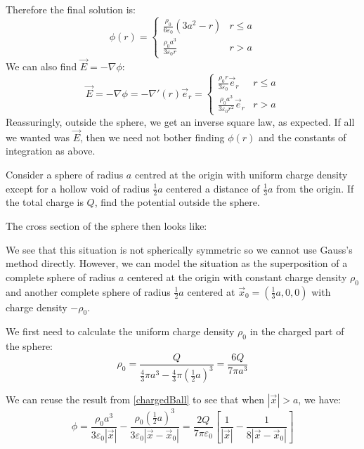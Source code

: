\documentclass[../main.tex]{subfiles}
\begin{document}
\begin{example}
  Therefore the final solution is:
  \[
    \phi(r) = \begin{cases}
    \frac{\rho_0}{6 \varepsilon_0}(3a^2 - r) &  r \leq a\\
    \frac{\rho_0 a^3}{3\varepsilon_0 r} &  r > a
    \end{cases}
  \]
  We can also find $\vec{E} = - \nabla \phi$:
  \[
    \vec{E} = -\nabla \phi = -\nabla'(r)\vec{e}_r = \begin{cases}
    \frac{\rho_0 r}{3\varepsilon_0} \vec{e}_r & r\leq a \\
    \frac{\rho_0 a^3}{3 \varepsilon_0 r^2}\vec{e}_r &  r> a
    \end{cases}
  \]
  Reassuringly, outside the sphere, we get an inverse square law, as expected.
  If all we wanted was $\vec{E}$, then we need not bother finding $\phi(r)$ and the constants of integration as above.
\end{example}
\begin{example}
  Consider a sphere of radius $a$ centred at the origin with uniform charge density except for a hollow void of radius $\frac{1}{2}a$ centered a distance of $\frac{1}{3}a$ from the origin. \label{asymmetricSpheres}
  If the total charge is $Q$, find the potential outside the sphere.

  The cross section of the sphere then looks like:
  \begin{center}
  \end{center}
  We see that this situation is not spherically symmetric so we cannot use Gauss's method directly.
  However, we can model the situation as the superposition of a complete sphere of radius $a$ centered at the origin with constant charge density $\rho_0$ and another complete sphere of radius $\frac{1}{2}a$ centered at $\vec{x}_0 = (\frac{1}{3}a, 0, 0)$ with charge density $-\rho_0$.

  We first need to calculate the uniform charge density $\rho_0$ in the charged part of the sphere:
  \[
    \rho_0 = \frac{Q}{\frac{4}{3}\pi a^3 - \frac{4}{3} \pi \left(\frac{1}{2}a\right)^3} = \frac{6Q}{7\pi a^3}
  \]

  We can reuse the result from \cref{chargedBall} to see that when $|\vec{x}| > a$, we have:
  \[
    \phi = \frac{\rho_0 a^3}{3 \varepsilon_0 |\vec{x}|} - \frac{\rho_0 (\frac{1}{2}a)^3}{3 \varepsilon_0 |\vec{x} - \vec{x}_0|} = \frac{2 Q}{7\pi \varepsilon_0}\left[\frac{1}{|\vec{x}|} - \frac{1}{8|\vec{x} - \vec{x}_0|}\right]
  \]
\end{example}
\end{document}
